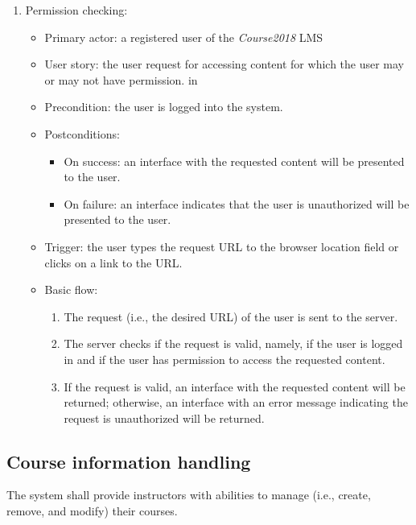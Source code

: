 \begin{enumerate}
\item Permission checking:
\begin{itemize}
\item Primary actor: 
    a registered user of the \emph{Course2018} LMS
\item User story:
    the user request for accessing content for which the user may or may not
    have permission.
 in
\item Precondition:
        the user is logged into the system.
\item Postconditions:
    \begin{itemize}
        \item On success: an interface with the requested content will be presented
            to the user.
        \item On failure: an interface indicates that the user is unauthorized will
            be presented to the user.
    \end{itemize}
\item Trigger: the user types the request URL to the browser location field
    or clicks on a link to the URL.
\item Basic flow:
    \begin{enumerate}
        \item The request (i.e., the desired URL) of the user is sent to the server.
        \item The server checks if the request is valid, namely, if the user
            is logged in and if the user has permission to access the requested
            content.
        \item If the request is valid, an interface with the requested content will
            be returned; otherwise, an interface with an error message 
            indicating the request is unauthorized will be returned.
    \end{enumerate}
\end{itemize}

\end{enumerate}


\subsection{Course information handling}
The system shall provide instructors with abilities to manage (i.e., create, remove,
and modify) their courses.
